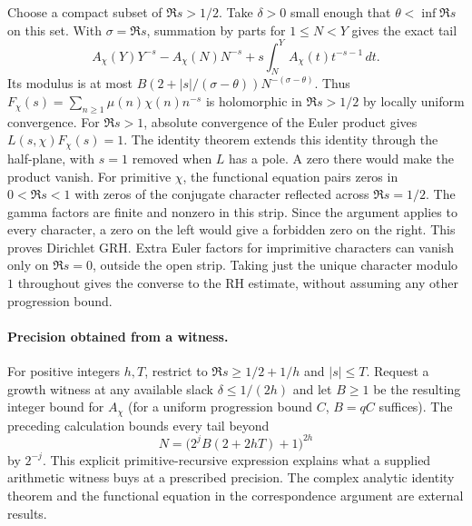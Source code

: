 Choose a compact subset of $\Re s>1/2$. Take $\delta>0$ small enough
that $\theta<\inf\Re s$ on this set. With $\sigma=\Re s$, summation by
parts for $1\leq N<Y$ gives the exact tail
\[
 A_\chi(Y)Y^{-s}-A_\chi(N)N^{-s}
       +s\int_N^Y A_\chi(t)t^{-s-1}\,dt .
\]
Its modulus is at most
$B(2+|s|/(\sigma-\theta))N^{-(\sigma-\theta)}$.
Thus $F_\chi(s)=\sum_{n\geq1}\mu(n)\chi(n)n^{-s}$ is holomorphic
in $\Re s>1/2$ by locally uniform convergence. For $\Re s>1$,
absolute convergence of the Euler product gives
$L(s,\chi)F_\chi(s)=1$. The identity theorem extends this identity
through the half-plane, with $s=1$ removed when $L$ has a pole.
A zero there would make the product vanish. For primitive $\chi$,
the functional equation pairs zeros in $0<\Re s<1$ with zeros of the
conjugate character reflected across $\Re s=1/2$. The gamma factors
are finite and nonzero in this strip. Since the argument applies to
every character, a zero on the left would give a forbidden zero on the
right. This proves Dirichlet GRH. Extra Euler factors for imprimitive
characters can vanish only on $\Re s=0$, outside the open strip.
Taking just the unique character modulo $1$ throughout gives the
converse to the RH estimate, without assuming any other progression
bound.

\paragraph{Precision obtained from a witness.}
For positive integers $h,T$, restrict to $\Re s\geq1/2+1/h$ and
$|s|\leq T$. Request a growth witness at any available slack
$\delta\leq 1/(2h)$ and let $B\geq1$ be the resulting integer
bound for $A_\chi$ (for a uniform progression bound $C$, $B=qC$
suffices). The preceding calculation bounds every tail beyond
\[
 N=\bigl(2^j B(2+2hT)+1\bigr)^{2h}
\]
by $2^{-j}$. This explicit primitive-recursive expression explains what
a supplied arithmetic witness buys at a prescribed precision. The
complex analytic identity theorem and the functional equation in the
correspondence argument are external results.
